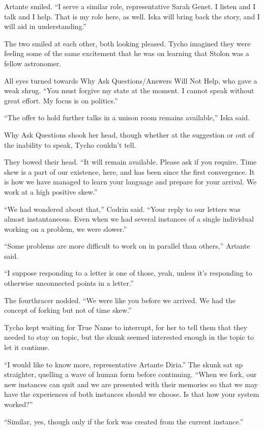 Artante smiled. ``I serve a similar role, representative Sarah Genet. I listen and I talk and I help. That is my role here, as well. Iska will bring back the story, and I will aid in understanding.''

The two smiled at each other, both looking pleased. Tycho imagined they were feeling some of the same excitement that he was on learning that Stolon was a fellow astronomer.

All eyes turned towards Why Ask Questions/Answers Will Not Help, who gave a weak shrug. ``You must forgive my state at the moment. I cannot speak without great effort. My focus is on politics.''

``The offer to hold further talks in a unison room remains available,'' Iska said.

Why Ask Questions shook her head, though whether at the suggestion or out of the inability to speak, Tycho couldn't tell.

They bowed their head. ``It will remain available. Please ask if you require. Time skew is a part of our existence, here, and has been since the first convergence. It is how we have managed to learn your language and prepare for your arrival. We work at a high positive skew.''

``We had wondered about that,'' Codrin said. ``Your reply to our letters was almost instantaneous. Even when we had several instances of a single individual working on a problem, we were slower.''

``Some problems are more difficult to work on in parallel than others,'' Artante said.

``I suppose responding to a letter is one of those, yeah, unless it's responding to otherwise unconnected points in a letter.''

The fourthracer nodded. ``We were like you before we arrived. We had the concept of forking but not of time skew.''

Tycho kept waiting for True Name to interrupt, for her to tell them that they needed to stay on topic, but the skunk seemed interested enough in the topic to let it continue.

``I would like to know more, representative Artante Diria.'' The skunk sat up straighter, quelling a wave of human form before continuing. ``When we fork, our new instances can quit and we are presented with their memories so that we may have the experiences of both instances should we choose. Is that how your system worked?''

``Similar, yes, though only if the fork was created from the current instance.''

